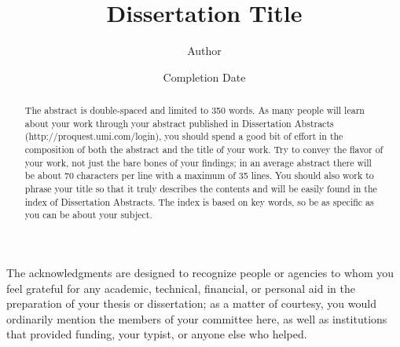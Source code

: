\documentclass{iuphd}
\title{Dissertation Title}
\author{Author}
\date{Completion Date}
\begin{document}
\maketitle

\acceptancepage

\copyrightpage


\begin{acknowledgments}
The acknowledgments are designed to recognize people or agencies to whom you feel grateful for any academic,
technical, financial, or personal aid in the preparation of your thesis or dissertation; as a matter of
courtesy, you would ordinarily mention the members of your committee here, as well as institutions that
provided funding, your typist, or anyone else who helped.
\end{acknowledgments}


\begin{abstract}
 The abstract is double-spaced and limited to 350 words. As many people will learn about
your work through your abstract published in Dissertation Abstracts (http://proquest.umi.com/login),
you should spend a good bit of effort in the composition of both the abstract and the title of your work.
Try to convey the flavor of your work, not just the bare bones of your findings; in an average abstract
there will be about 70 characters per line with a maximum of 35 lines. You should also work to phrase your
title so that it truly describes the contents and will be easily found in the index of Dissertation Abstracts.
The index is based on key words, so be as specific as you can be about your subject. 
\end{abstract}

\tableofcontents






%
\end{document}
